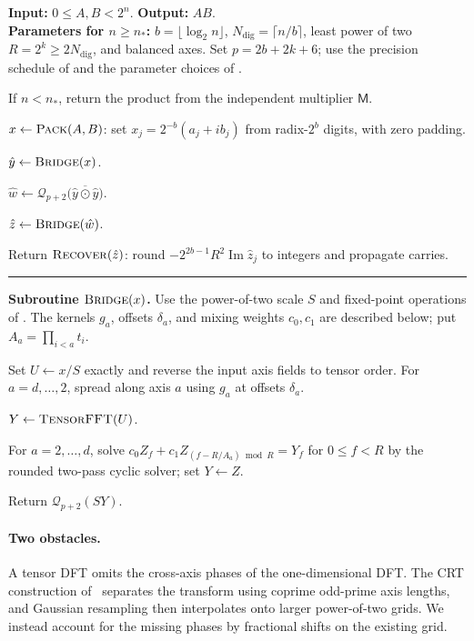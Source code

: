 \documentclass[11pt]{article}
\theoremstyle{definition}
\renewcommand{\label}[1]{}%
\newcommand{\Quant}{\mathcal{Q}}
\newcommand{\Pack}{\textnormal{\textsc{Pack}}}
\newcommand{\Bridge}{\textnormal{\textsc{Bridge}}}
\newcommand{\TensorFFT}{\textnormal{\textsc{TensorFFT}}}
\newcommand{\Recover}{\textnormal{\textsc{Recover}}}
\begin{document}
\begin{algorithm}[htbp]
\caption{Integer multiplication on one power-of-two grid}\label{alg:main}
\small
{}
\textbf{Input:} $0\le A,B<2^n$. \textbf{Output:} $AB$.\\
\textbf{Parameters for $n\ge n_*$:}
$b=\lfloor\log_2n\rfloor$, $N_{\mathrm{dig}}=\lceil n/b\rceil$,
least power of two $R=2^k\ge2N_{\mathrm{dig}}$, and balanced axes.
Set $p=2b+2k+6$; use the precision schedule of  and the parameter choices of .
\begin{algsteps}
\item If $n<n_*$, return the product from the independent multiplier $\mathsf{M}$.
\item $x\leftarrow\Pack(A,B)$: set $x_j=2^{-b}(a_j+ib_j)$ from radix-$2^b$ digits, with zero padding.
\item $\hat y\leftarrow\Bridge(x)$.
\item $\hat w\leftarrow\Quant_{p+2}\bigl(\overline{\hat y\odot\hat y}\bigr)$.
\item $\hat z\leftarrow\Bridge(\hat w)$.
\item Return $\Recover(\hat z)$: round $-2^{2b-1}R^2\operatorname{Im}\hat z_j$ to integers and propagate carries.
\end{algsteps}
\smallskip\hrule\smallskip
\textbf{Subroutine $\Bridge(x)$.}
Use the power-of-two scale $S$ and fixed-point operations of .
The kernels $g_a$, offsets $\delta_a$, and mixing weights $c_0,c_1$ are described below; put $A_a=\prod_{i<a}t_i$.
\begin{algsteps}[resume]
\item Set $U\leftarrow x/S$ exactly and reverse the input axis fields to tensor order.
For $a=d,\ldots,2$, spread along axis $a$ using $g_a$ at offsets $\delta_a$.
\item $Y\leftarrow\TensorFFT(U)$.
\item For $a=2,\ldots,d$, solve
$c_0Z_f+c_1Z_{(f-R/A_a)\bmod R}=Y_f$ for $0\le f<R$ by the rounded two-pass cyclic solver; set $Y\leftarrow Z$.
\item Return $\Quant_{p+2}(SY)$.
\end{algsteps}
\end{algorithm}

\paragraph{Two obstacles.}
A tensor DFT omits the cross-axis phases of the one-dimensional DFT.
The CRT construction of~\cite{HvdH21,OAI26} separates the transform using coprime odd-prime axis lengths, and Gaussian resampling then interpolates onto larger power-of-two grids.
We instead account for the missing phases by fractional shifts on the existing grid.
\end{document}
